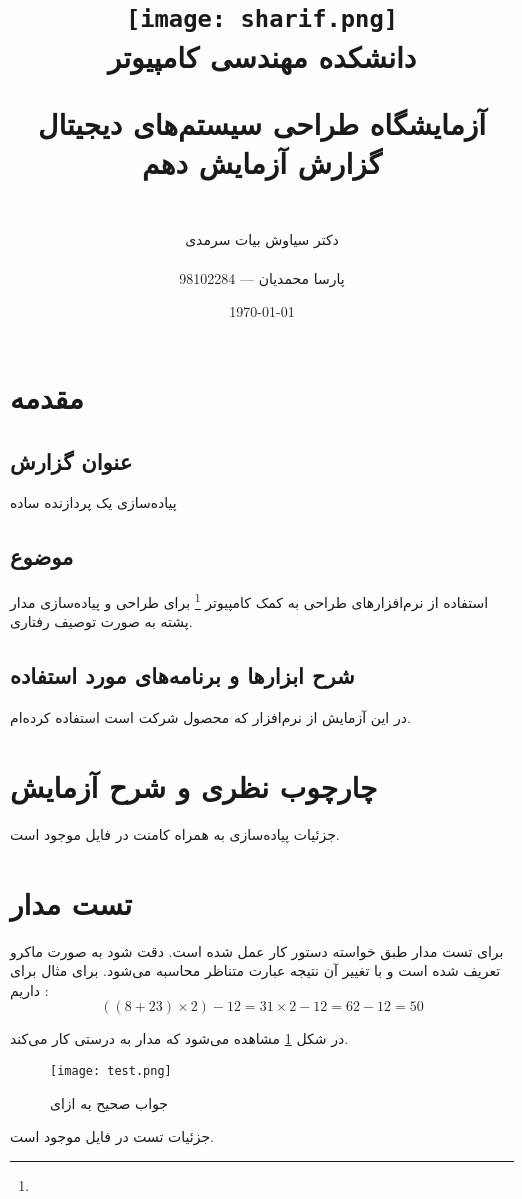 \documentclass[fleqn]{article}
\title{
\texttt{[image: sharif.png]}\\
\normalsize{دانشکده مهندسی کامپیوتر}\\
\vspace{1cm}
	
\huge{آزمایشگاه طراحی سیستم‌های دیجیتال}
\\ 
\Large{گزارش آزمایش دهم}
\\
}
\author{
\\
دکتر سیاوش بیات سرمدی
\\
\\
پارسا محمدیان --- 98102284
}
\date{\today}
\begin{document}
\clearpage\maketitle
\thispagestyle{empty}

\newpage

\pagestyle{fancy}



\tableofcontents

\setcounter{page}{1}

\newpage

\section{مقدمه}

\subsection*{عنوان گزارش}
پیاده‌سازی یک پردازنده ساده
\subsection*{موضوع}
استفاده از نرم‌افزارهای طراحی به کمک کامپیوتر \footnote{} برای طراحی 
و پیاده‌سازی مدار پشته به صورت توصیف رفتاری.
\subsection*{شرح ابزارها و برنامه‌های مورد استفاده}
در این آزمایش از نرم‌افزار  که محصول شرکت  است 
استفاده کرده‌ام.

\section{چارچوب نظری و شرح آزمایش}
جزئیات پیاده‌سازی به همراه کامنت در فایل 
موجود است.

\section{تست مدار}
برای تست مدار طبق خواسته دستور کار عمل شده است. دقت شود 
به صورت ماکرو تعریف شده است و با تغییر آن نتیجه عبارت متناظر محاسبه می‌شود. برای مثال برای 
داریم : 
$$
((8+23) \times 2)-12 = 31 \times 2 - 12 = 62 - 12 = 50
$$

در شکل 
\ref{test} 
مشاهده می‌شود که مدار به درستی کار می‌کند.

\begin{figure}
	\centering
	\texttt{[image: test.png]}
	\caption{جواب صحیح به ازای }
	\label{test}
\end{figure}

جزئیات تست در فایل 
موجود است. 
\end{document}
